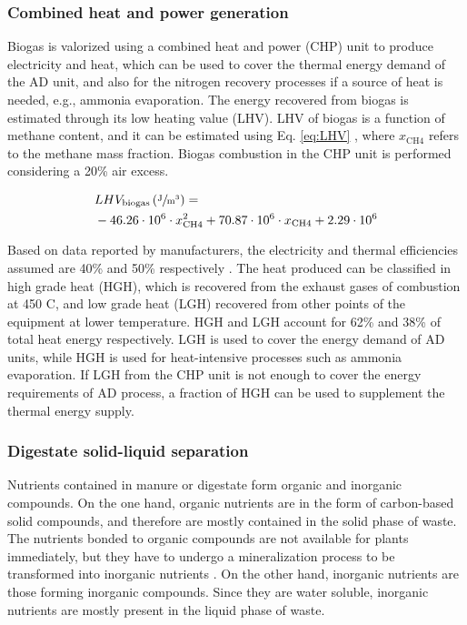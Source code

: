 \begin{refsection}[referencesCh6]
\subsubsection{Combined heat and power generation}
Biogas is valorized using a combined heat and power (CHP) unit to produce electricity and heat, which can be used to cover the thermal energy demand of the AD unit, and also for the nitrogen recovery processes if a source of heat is needed, e.g., ammonia evaporation. The energy recovered from biogas is estimated through its low heating value (LHV). LHV of biogas is a function of methane content, and it can be estimated using Eq. \ref{eq:LHV} \citep{BiogasLHV}, where $x_{\text{CH4}}$ refers to the methane mass fraction. Biogas combustion in the CHP unit is performed considering a 20\% air excess.

\begin{align}
	& LHV_{\text{biogas}} \left(\sfrac{\text{J}}{\text{m}^3}\right)= \label{eq:LHV} \\
	& -46.26 \cdot 10^6 \cdot x_{\text{CH4}}^2 + 70.87 \cdot 10^6 \cdot x_{\text{CH4}} + 2.29\cdot 10^6 \nonumber
\end{align}

Based on data reported by manufacturers, the electricity and thermal efficiencies assumed are 40\% and 50\% respectively \citep{ClarkeEnergy}. The heat produced can be classified in high grade heat (HGH), which is recovered from the exhaust gases of combustion at 450 \textdegree C, and low grade heat (LGH) recovered from other points of the equipment at lower temperature. HGH and LGH account for 62\% and 38\% of total heat energy respectively.
LGH is used to cover the energy demand of AD units, while HGH is used for heat-intensive processes such as ammonia evaporation. If LGH from the CHP unit is not enough to cover the energy requirements of AD process, a fraction of HGH can be used to supplement the thermal energy supply. 

\subsubsection{Digestate solid-liquid separation}
Nutrients contained in manure or digestate form organic and inorganic compounds. On the one hand, organic nutrients are in the form of carbon-based solid compounds, and therefore are mostly contained in the solid phase of waste. The nutrients bonded to organic compounds are not available for plants immediately, but they have to undergo a mineralization process to be transformed into inorganic nutrients \citep{USDAWaste}. On the other hand, inorganic nutrients are those forming inorganic compounds. Since they are water soluble, inorganic nutrients are mostly present in the liquid phase of waste. 


\end{refsection}
